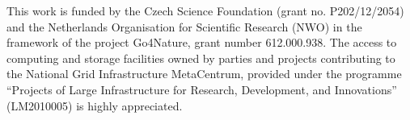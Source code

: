  This work is funded by the Czech Science Foundation (grant no. P202/12/2054) and the Netherlands
Organisation for Scientific Research (NWO) in the framework of the project Go4Nature, grant number 612.000.938. 
The access to computing and storage facilities owned by parties and projects contributing to the National Grid 
Infrastructure MetaCentrum, provided under the 
programme ``Projects of Large Infrastructure for Research, Development, and Innovations'' (LM2010005) is highly appreciated.


